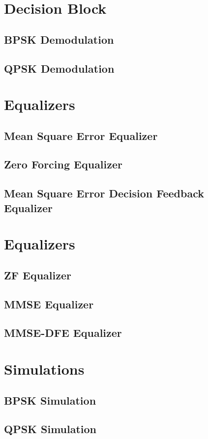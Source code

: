 \documentclass[]{article}
\begin{document}
\section{Decision Block}
\label{app:dblocks}
\subsection{BPSK Demodulation}
\label{app:bpsk_demod}


\subsection{QPSK Demodulation}
\label{app:qpsk_demod}


\section{Equalizers}
\label{app:equal}
\subsection{Mean Square Error Equalizer}
\label{app:mse}


%

\subsection{Zero Forcing Equalizer}
\label{app:zf}


\subsection{Mean Square Error Decision Feedback Equalizer}
\label{app:dfe}
%

\section{Equalizers}
\subsection{ZF Equalizer}

\subsection{MMSE Equalizer}

\subsection{MMSE-DFE Equalizer}



\section{Simulations}
\subsection{BPSK Simulation}


\subsection{QPSK Simulation}

\end{document}
